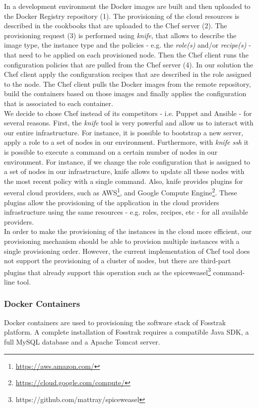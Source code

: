 In a development environment the Docker images are built and then uploaded to the Docker Registry
repository (1). The provisioning of the cloud resources is described in the cookbooks that are uploaded
to the Chef server (2). The provisioning request (3) is performed using \textit{knife}, that allows to
describe the image type, the instance type and the policies - e.g. the \textit{role(s)} and/or \textit{recipe(s)} -
that need to be applied on each provisioned node. Then the Chef client runs the configuration policies
that are pulled from the Chef server (4). In our solution the Chef client apply the configuration recipes
that are described in the role assigned to the node. The Chef client pulls the Docker images from the
remote repository, build the containers based on those images and finally applies the configuration
that is associated to each container.\\

We decide to chose Chef instead of its competitors - i.e. Puppet and Ansible - for several
reasons. First, the \textit{knife} tool is very powerful and allow us to
interact with our entire infrastructure. For instance, it is possible to bootstrap a new server,
apply a role to a set of nodes in our environment. Furthermore, with \textit{knife ssh} it is possible
to execute a command on a certain number of nodes in our environment. For instance, if we change
the role configuration that is assigned to a set of nodes in our infrastructure, knife allows to
update all these nodes with the most recent policy with a single command. Also, knife provides plugins
for several cloud providers, such as \gls{AWS}\footnote{\url{https://aws.amazon.com/}}, and Google
Compute Engine\footnote{\url{https://cloud.google.com/compute/}}. These plugins allow the
provisioning of the application in the cloud providers infrastructure using the same
resources - e.g. roles, recipes, etc - for all available providers.\\

In order to make the provisioning of the instances in the cloud more efficient, our
provisioning mechanism should be able to provision multiple instances with a single
provisioning order. However, the current implementation of Chef tool does not support
the provisioning of a cluster of nodes, but there are third-part plugins that already
support this operation such as the spiceweasel\footnote{https://github.com/mattray/spiceweasel}
command-line tool.

\subsubsection{Docker Containers}
\label{subs:impl_docker}
Docker containers are used to provisioning the software stack of Fosstrak platform. A complete
installation of Fosstrak requires a compatible Java \gls{SDK}, a full MySQL database and a Apache Tomcat
server.\\

